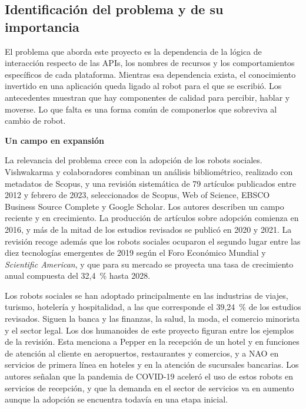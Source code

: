 \documentclass[11pt,letterpaper]{article}
\begin{document}
\subsection{Identificación del problema y de su importancia}

El problema que aborda este proyecto es la dependencia de la lógica de interacción respecto de las APIs, los nombres de recursos y los comportamientos específicos de cada plataforma. Mientras esa dependencia exista, el conocimiento invertido en una aplicación queda ligado al robot para el que se escribió. Los antecedentes muestran que hay componentes de calidad para percibir, hablar y moverse. Lo que falta es una forma común de componerlos que sobreviva al cambio de robot.

\par\medskip\noindent\textbf{Un campo en expansión}\par

La relevancia del problema crece con la adopción de los robots sociales. Vishwakarma y colaboradores \cite{socialrobots} combinan un análisis bibliométrico, realizado con metadatos de Scopus, y una revisión sistemática de 79 artículos publicados entre 2012 y febrero de 2023, seleccionados de Scopus, Web of Science, EBSCO Business Source Complete y Google Scholar. Los autores describen un campo reciente y en crecimiento. La producción de artículos sobre adopción comienza en 2016, y más de la mitad de los estudios revisados se publicó en 2020 y 2021. La revisión recoge además que los robots sociales ocuparon el segundo lugar entre las diez tecnologías emergentes de 2019 según el Foro Económico Mundial y \emph{Scientific American}, y que para su mercado se proyecta una tasa de crecimiento anual compuesta del 32,4~\% hasta 2028.

Los robots sociales se han adoptado principalmente en las industrias de viajes, turismo, hotelería y hospitalidad, a las que corresponde el 39,24~\% de los estudios revisados. Siguen la banca y las finanzas, la salud, la moda, el comercio minorista y el sector legal. Los dos humanoides de este proyecto figuran entre los ejemplos de la revisión. Esta menciona a Pepper en la recepción de un hotel y en funciones de atención al cliente en aeropuertos, restaurantes y comercios, y a NAO en servicios de primera línea en hoteles y en la atención de sucursales bancarias. Los autores señalan que la pandemia de COVID-19 aceleró el uso de estos robots en servicios de recepción, y que la demanda en el sector de servicios va en aumento aunque la adopción se encuentra todavía en una etapa inicial.
\end{document}
